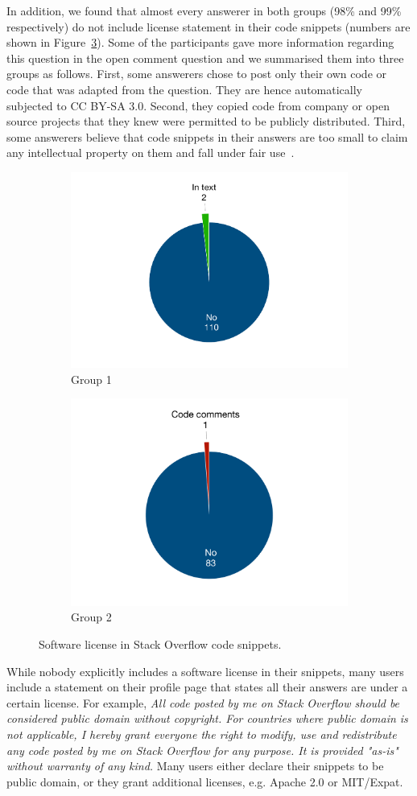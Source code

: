 \documentclass{svjour3}                     %
\begin{document}
In addition, we found that almost every answerer in both groups (98\% and
99\% respectively) do not include license statement in their code snippets
(numbers are shown in Figure~\ref{fig:survey_license}). Some of the participants
gave more information regarding this question in the open comment question and
we summarised them into three groups as follows. First, some answerers chose to post only their
own code or code that was adapted from the question. They are hence
automatically subjected to CC BY-SA 3.0. Second, they copied code from company
or open source projects that they knew were permitted to be publicly
distributed. Third, some answerers believe that code snippets in their answers
are too small to claim any intellectual property on them and fall under fair
use~\citep{fairuse}.

\begin{figure}
	\begin{subfigure}{.5\textwidth}
		\centering
		\includegraphics[width=.4\linewidth]{survey_license_1}
		\caption{Group 1}
		\label{fig:survey_license_1}
	\end{subfigure}%
	\begin{subfigure}{.5\textwidth}
		\centering
		\includegraphics[width=.4\linewidth]{survey_license_2}
		\caption{Group 2}
		\label{fig:survey_license_2}
	\end{subfigure}
	\caption{Software license in Stack Overflow code snippets.}
	\label{fig:survey_license}
\end{figure}

While nobody explicitly includes a software license in their snippets,
many users include a statement on their profile page that states all their
answers are under a certain license. For example, \textit{All code posted by me on
	Stack Overflow should be considered public domain without copyright. For
	countries where public domain is not applicable, I hereby grant everyone the
	right to modify, use and redistribute any code posted by me on Stack Overflow
	for any purpose. It is provided "as-is" without warranty of any kind.}  Many
users either declare their snippets to be public domain, or they grant
additional licenses, e.g. Apache 2.0 or MIT/Expat.
\end{document}

